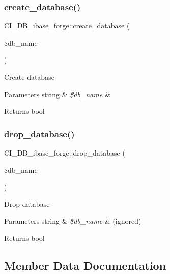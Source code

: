 \subsubsection{\texorpdfstring{create\+\_\+database()}{create\_database()}}
{\footnotesize\ttfamily C\+I\+\_\+\+D\+B\+\_\+ibase\+\_\+forge\+::create\+\_\+database (\begin{DoxyParamCaption}\item[{}]{\$db\+\_\+name }\end{DoxyParamCaption})}

Create database


\begin{DoxyParams}[1]{Parameters}
string & {\em \$db\+\_\+name} & \\
\hline
\end{DoxyParams}
\begin{DoxyReturn}{Returns}
bool 
\end{DoxyReturn}
\mbox{\label{class_c_i___d_b__ibase__forge_a200ff8890c1984750a0a4083bf501adf}} 
\subsubsection{\texorpdfstring{drop\+\_\+database()}{drop\_database()}}
{\footnotesize\ttfamily C\+I\+\_\+\+D\+B\+\_\+ibase\+\_\+forge\+::drop\+\_\+database (\begin{DoxyParamCaption}\item[{}]{\$db\+\_\+name }\end{DoxyParamCaption})}

Drop database


\begin{DoxyParams}[1]{Parameters}
string & {\em \$db\+\_\+name} & (ignored) \\
\hline
\end{DoxyParams}
\begin{DoxyReturn}{Returns}
bool 
\end{DoxyReturn}


\subsection{Member Data Documentation}
\mbox{\label{class_c_i___d_b__ibase__forge_a93611d5f58ba7db71b29b2166d182847}} 
